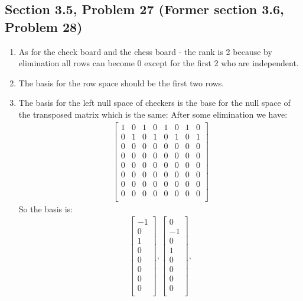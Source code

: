 \documentclass[a4paper,11pt]{article}
\begin{document}
\subsection*{Section 3.5, Problem 27  (Former section 3.6, Problem 28)}
\begin{enumerate}
\item As for the check board and the chess board - the rank is 2 because by elimination all rows can become 0 except for the first 2 who are independent.
\item The basis for the row space should be the first two rows.
\item The basis for the left null space of checkers is the base for the null space of the transposed matrix which is the same:
After some elimination we have:
\begin{align*}
\begin{bmatrix}
1 & 0 & 1 & 0 & 1 & 0 & 1 & 0 \\
0 & 1 & 0 & 1 & 0 & 1 & 0 & 1 \\
0 & 0 & 0 & 0 & 0 & 0 & 0 & 0 \\
0 & 0 & 0 & 0 & 0 & 0 & 0 & 0 \\
0 & 0 & 0 & 0 & 0 & 0 & 0 & 0 \\
0 & 0 & 0 & 0 & 0 & 0 & 0 & 0 \\
0 & 0 & 0 & 0 & 0 & 0 & 0 & 0 \\
0 & 0 & 0 & 0 & 0 & 0 & 0 & 0 \\
\end{bmatrix}
\end{align*}
So the basis is:
\begin{align*}
\begin{bmatrix}
-1 \\
0 \\
1 \\
0 \\
0 \\
0 \\
0 \\
0 \\
\end{bmatrix},
\begin{bmatrix}
0 \\
-1 \\
0 \\
1 \\
0 \\
0 \\
0 \\
0 \\
\end{bmatrix},

\end{align*}
\end{enumerate}
\end{document}

